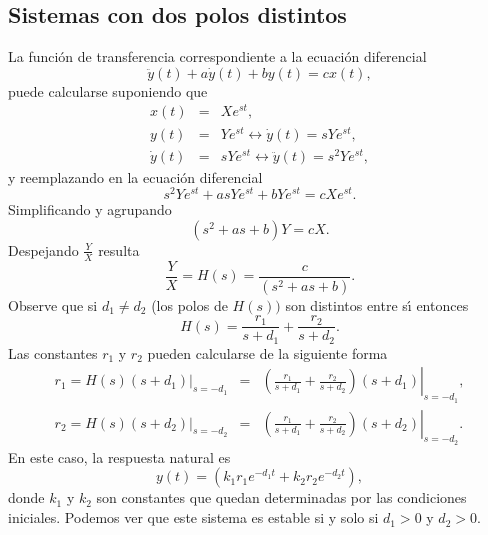 \subsection{Sistemas con dos polos distintos}

La funci\'{o}n de transferencia correspondiente a la ecuaci\'{o}n diferencial 
\begin{equation}
        \ddot{y}\left( t\right) +a\dot{y}\left( t\right) +by\left( t\right) = cx\left( t\right) ,
\end{equation}
puede calcularse suponiendo que 
\begin{eqnarray}
 x\left( t\right)        &=&     Xe^{st},                                                                \\
 y\left( t\right)        &=&     Ye^{st}\longleftrightarrow \dot{y}\left( t\right) =sYe^{st},            \\
 \dot{y}\left( t\right)  &=&     sYe^{st}\longleftrightarrow \ddot{y}\left(t\right) =s^{2}Ye^{st},
\end{eqnarray}
y reemplazando en la ecuaci\'{o}n diferencial 
\begin{equation}
        s^{2}Ye^{st}+asYe^{st}+bYe^{st}=cXe^{st}.
\end{equation}
Simplificando y agrupando 
\begin{equation}
        \left( s^{2}+as+b\right) Y=cX.
\end{equation}
Despejando $\frac{Y}{X}$ resulta 
\begin{equation}
        \frac{Y}{X}=H\left( s\right) =\frac{c}{\left( s^{2}+as+b\right) }.
\end{equation}
Observe que si $d_{1}\neq d_{2}$ (los polos de $H\left( s\right) )$ son distintos entre s\'{\i} entonces 
\begin{equation}
        H\left( s\right) =\frac{r_{1}}{s+d_{1}}+\frac{r_{2}}{s+d_{2}}.
\end{equation}
Las constantes $r_{1}$ y $r_{2}$ pueden calcularse de la siguiente forma
\begin{eqnarray}
        r_{1} = 
        \left. 
                H\left( s\right) \left( s+d_{1}\right) 
        \right| _{s=-d_{1}} &=&
        \left.
                \left( \frac{r_{1}}{s+d_{1}}+\frac{r_{2}}{s+d_{2}}\right) 
                \left( s+d_{1} \right) 
        \right| _{s=-d_{1}},                                                      \\
        r_{2} = 
        \left. 
          H\left( s\right) \left( s+d_{2}\right) 
        \right| _{s=-d_{2}} &=&
        \left. 
                 \left( \frac{r_{1}}{s+d_{1}}+\frac{r_{2}}{s+d_{2}}\right) 
                 \left(s+d_{2}\right) 
        \right| _{s=-d_{2}}.
\end{eqnarray}
En este caso, la respuesta natural es 
\begin{equation}
        y\left( t\right) =\left( k_{1} r_{1}e^{-d_{1}t}+ k_{2} r_{2}e^{-d_{2}t}\right) ,
\end{equation}
donde $k_{1}$  y $k_{2}$ son constantes que quedan determinadas por las condiciones iniciales.
Podemos ver que este sistema es estable si y solo si $d_{1} > 0$ y $d_{2} > 0$.


